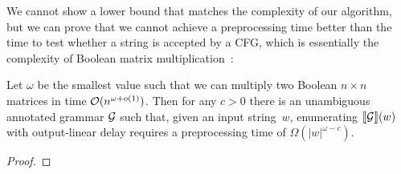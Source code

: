%
%
We cannot show a lower bound that matches the complexity of our algorithm, but
we can prove that we cannot achieve a preprocessing time better than the time to
test whether a string is accepted by a CFG, which is essentially
the complexity of Boolean matrix multiplication~\cite{AbboudBW18}:
%
%

\begin{proposition}
  \label{gram:prp:cubiclowerbound}
  Let $\omega$ be the
  smallest value
  such that we can multiply two Boolean $n\times
  n$ matrices in time $\mathcal{O}(n^{\omega+o(1)})$. Then for any $c>0$ there is an unambiguous
  annotated grammar $\mathcal{G}$ such that, given an input string~$w$, enumerating 
  ${\llbracket{\mathcal{G}}\rrbracket}(w)$ with output-linear delay requires a preprocessing time of
  $\Omega(|w|^{\omega-c})$.
\end{proposition}
\begin{proof}
  
\end{proof}

%
%
%
